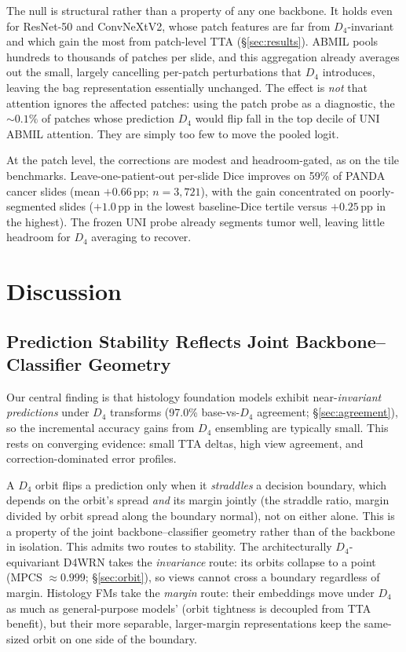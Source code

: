 \documentclass{melba}
\begin{document}
The null is structural rather than a property of any one backbone. It holds even for ResNet-50 and ConvNeXtV2, whose patch features are far from $D_4$-invariant and which gain the most from patch-level TTA (\S\ref{sec:results}). ABMIL pools hundreds to thousands of patches per slide, and this aggregation already averages out the small, largely cancelling per-patch perturbations that $D_4$ introduces, leaving the bag representation essentially unchanged. The effect is \emph{not} that attention ignores the affected patches: using the patch probe as a diagnostic, the ${\sim}0.1\%$ of patches whose prediction $D_4$ would flip fall in the top decile of UNI ABMIL attention. They are simply too few to move the pooled logit.

At the patch level, the corrections are modest and headroom-gated, as on the tile benchmarks. Leave-one-patient-out per-slide Dice improves on 59\% of PANDA cancer slides (mean $+0.66$\,pp; $n=3{,}721$), with the gain concentrated on poorly-segmented slides ($+1.0$\,pp in the lowest baseline-Dice tertile versus $+0.25$\,pp in the highest). The frozen UNI probe already segments tumor well, leaving little headroom for $D_4$ averaging to recover.



\section{Discussion}
\label{sec:discussion}

\subsection{Prediction Stability Reflects Joint Backbone--Classifier Geometry}

Our central finding is that histology foundation models exhibit near-\emph{invariant} \emph{predictions} under $D_4$ transforms (97.0\% base-vs-$D_4$ agreement; \S\ref{sec:agreement}), so the incremental accuracy gains from $D_4$ ensembling are typically small. This rests on converging evidence: small TTA deltas, high view agreement, and correction-dominated error profiles.

A $D_4$ orbit flips a prediction only when it \emph{straddles} a decision boundary, which depends on the orbit's spread \emph{and} its margin jointly (the straddle ratio, margin divided by orbit spread along the boundary normal), not on either alone. This is a property of the joint backbone--classifier geometry rather than of the backbone in isolation. This admits two routes to stability. The architecturally $D_4$-equivariant D4WRN takes the \emph{invariance} route: its orbits collapse to a point (MPCS $\approx 0.999$; \S\ref{sec:orbit}), so views cannot cross a boundary regardless of margin. Histology FMs take the \emph{margin} route: their embeddings move under $D_4$ as much as general-purpose models' (orbit tightness is decoupled from TTA benefit), but their more separable, larger-margin representations keep the same-sized orbit on one side of the boundary. 
\end{document}
